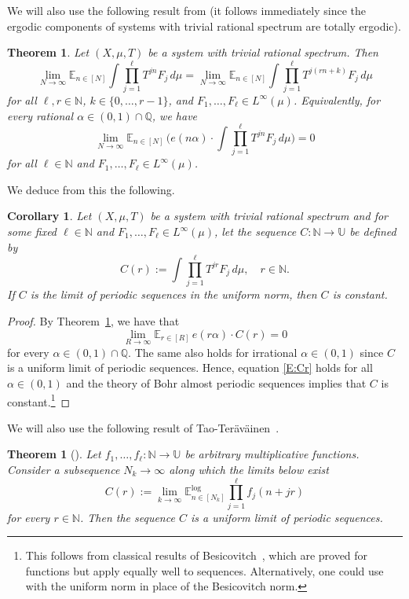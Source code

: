 \documentclass[11pt]{amsart}
\newtheorem{theorem}[lemma]{Theorem}
\newtheorem{corollary}[lemma]{Corollary}
\theoremstyle{definition}
\newcommand{\lE}{\mathbb{E}^{\log}}
\newcommand{\E}{{\mathbb E}}
\newcommand{\N}{{\mathbb N}}
\newcommand{\Q}{{\mathbb Q}}
\newcommand{\U}{{\mathbb U}}
\begin{document}
	We will also use the following result from \cite[Theorem~6.4]{Fr04}
	(it follows immediately since the ergodic components of systems with trivial rational spectrum are totally ergodic).
	\begin{theorem}\label{T:F}
		Let $(X,\mu,T)$ be a system with trivial rational spectrum. Then
		$$
		\lim_{N\to\infty}\E_{n\in [N]}  \int \prod_{j=1}^\ell T^{jn}F_j\, d\mu=	 	\lim_{N\to\infty}\E_{n\in [N]}  \int \prod_{j=1}^\ell T^{j(rn+k)}F_j\, d\mu
		$$
		for all $\ell,r\in \N$, $k\in \{0,\ldots, r-1\}$,   and $F_1,\ldots, F_\ell\in L^\infty(\mu)$. Equivalently, for every  rational $\alpha\in (0,1)\cap \Q$, we have
		$$
		\lim_{N\to\infty}\E_{n\in [N]} \, \Big( e(n\alpha)\cdot \int \prod_{j=1}^\ell T^{jn}F_j\, d\mu \Big)=0
		$$
		for all $\ell\in \N$  and $F_1,\ldots, F_\ell\in L^\infty(\mu)$.
	\end{theorem}
	We deduce from this the following.
	\begin{corollary}\label{C:F}
		Let $(X,\mu,T)$ be a system with trivial rational spectrum and  for some  fixed $\ell\in\N$ and $F_1,\ldots, F_\ell\in L^\infty(\mu)$, let  the sequence $C\colon \N\to \U$ be defined by
		$$
		C(r):= \int \prod_{j=1}^\ell T^{jr}F_j\, d\mu, \quad r\in \N.
		$$
		If $C$ is  the limit of periodic sequences in the uniform norm, then $C$ is constant.
	\end{corollary}
	\begin{proof}
		By Theorem~\ref{T:F}, we have that
		\begin{equation}\label{E:Cr}
			\lim_{R\to\infty} \E_{r\in[R]}\,  e(r\alpha)\cdot C(r)=0
		\end{equation}
		for every $\alpha\in (0,1)\cap \Q$. The same also holds for irrational $\alpha\in (0,1)$ since $C$ is a uniform limit of periodic sequences. Hence, equation \eqref{E:Cr} holds for all $\alpha\in(0,1)$
		and  the theory of Bohr almost periodic  sequences implies that $C$ is constant.\footnote{This follows from classical  results of Besicovitch~\cite{Bes55}, which are proved  for functions but apply equally well to sequences. Alternatively, one could use \cite[Theorem~2.7]{BPLR20} with the uniform norm in place of the Besicovitch norm.}
	\end{proof}
	We will also use the following result of Tao-Ter\"av\"ainen~\cite{TT18}.
	\begin{theorem}[\cite{TT18}]\label{T:TT}
		Let $f_1,\ldots,f_\ell\colon \N\to \U$ be arbitrary multiplicative functions. Consider a subsequence $N_k\to \infty$ along which the limits below exist
		$$
		C(r):=	\lim_{k\to\infty}\lE_{n\in[N_k]} \prod_{j=1}^\ell f_j(n+jr)
		$$
		for every $r\in \N$. Then the sequence $C$ is a uniform limit of periodic sequences.
	\end{theorem}
	
\end{document}
